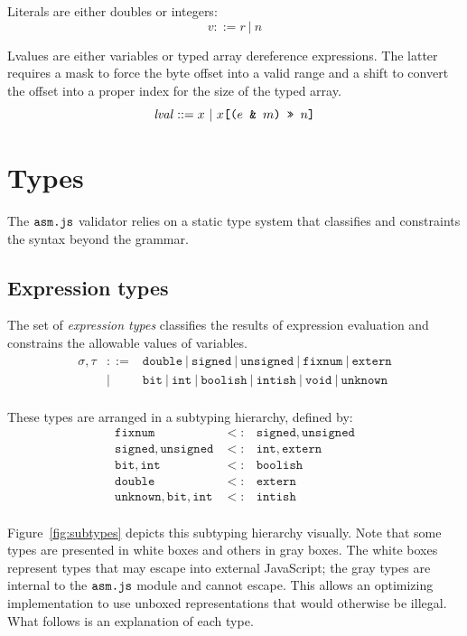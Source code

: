 \documentclass{article}
\newcommand{\paren}[1]{\mathjs{(}{#1}\mathjs{)}}
\newcommand{\mathjs}[1]{\mbox{\texttt{{#1}}}}
\newcommand{\bit}{\mathtt{bit}}
\newcommand{\unsigned}{\mathtt{unsigned}}
\newcommand{\signed}{\mathtt{signed}}
\newcommand{\fixnum}{\mathtt{fixnum}}
\newcommand{\double}{\mathtt{double}}
\newcommand{\extern}{\mathtt{extern}}
\newcommand{\unk}{\mathtt{unknown}}
\newcommand{\void}{\mathtt{void}}
\newcommand{\getprop}[2]{{#1}\mathjs{[}{#2}\mathjs{]}}
\renewcommand{\int}{\mathtt{int}}
\newcommand{\boolish}{\mathtt{boolish}}
\newcommand{\intish}{\mathtt{intish}}
\begin{document}
Literals are either doubles or integers:
\[
v ::= r ~|~ n
\]

Lvalues are either variables or typed array dereference
expressions. The latter requires a mask to force the byte offset into
a valid range and a shift to convert the offset into a proper index
for the size of the typed array.
\[
\mathit{lval} ::= x ~|~ \getprop{x}{\paren{e\mathjs{ \& }m}\mathjs{ >> }n}
\]

\section{Types}
\label{sec:types}

The $\mathjs{asm.js}$ validator relies on a static type system that
classifies and constraints the syntax beyond the grammar.

\subsection{Expression types}

The set of {\it expression types} classifies the results of expression
evaluation and constrains the allowable values of variables.
\[
\begin{array}{rcl}
\sigma, \tau & ::= & \double ~|~ \signed ~|~ \unsigned ~|~ \fixnum ~|~ \extern \\
             &  |  & \bit ~|~ \int ~|~ \boolish ~|~ \intish ~|~ \void ~|~ \unk \\
\end{array}
\]

These types are arranged in a subtyping hierarchy, defined by:
\[
\begin{array}{rcl}
\fixnum            & <: & \signed, \unsigned \\
\signed, \unsigned & <: & \int, \extern \\
\bit, \int         & <: & \boolish \\
\double            & <: & \extern \\
\unk, \bit, \int   & <: & \intish \\
\end{array}
\]

Figure~\ref{fig:subtypes} depicts this subtyping hierarchy
visually. Note that some types are presented in white boxes and others
in gray boxes. The white boxes represent types that may escape into
external JavaScript; the gray types are internal to the
$\mathjs{asm.js}$ module and cannot escape. This allows an optimizing
implementation to use unboxed representations that would otherwise be
illegal. What follows is an explanation of each type.
\end{document}
